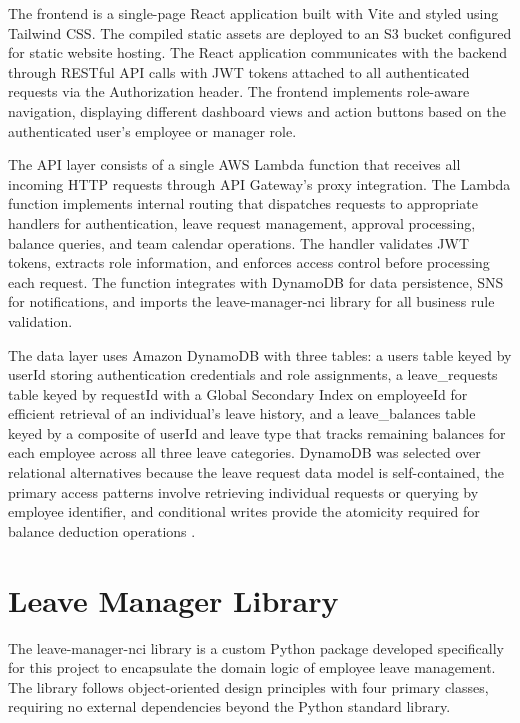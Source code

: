 \documentclass[conference]{IEEEtran}
\begin{document}
The frontend is a single-page React application built with Vite and styled using Tailwind CSS. The compiled static assets are deployed to an S3 bucket configured for static website hosting. The React application communicates with the backend through RESTful API calls with JWT tokens attached to all authenticated requests via the Authorization header. The frontend implements role-aware navigation, displaying different dashboard views and action buttons based on the authenticated user's employee or manager role.

The API layer consists of a single AWS Lambda function that receives all incoming HTTP requests through API Gateway's proxy integration. The Lambda function implements internal routing that dispatches requests to appropriate handlers for authentication, leave request management, approval processing, balance queries, and team calendar operations. The handler validates JWT tokens, extracts role information, and enforces access control before processing each request. The function integrates with DynamoDB for data persistence, SNS for notifications, and imports the leave-manager-nci library for all business rule validation.

The data layer uses Amazon DynamoDB with three tables: a users table keyed by userId storing authentication credentials and role assignments, a leave\_requests table keyed by requestId with a Global Secondary Index on employeeId for efficient retrieval of an individual's leave history, and a leave\_balances table keyed by a composite of userId and leave type that tracks remaining balances for each employee across all three leave categories. DynamoDB was selected over relational alternatives because the leave request data model is self-contained, the primary access patterns involve retrieving individual requests or querying by employee identifier, and conditional writes provide the atomicity required for balance deduction operations \cite{awsdynamodb}.

\section{Leave Manager Library}

The leave-manager-nci library is a custom Python package developed specifically for this project to encapsulate the domain logic of employee leave management. The library follows object-oriented design principles with four primary classes, requiring no external dependencies beyond the Python standard library.
\end{document}
